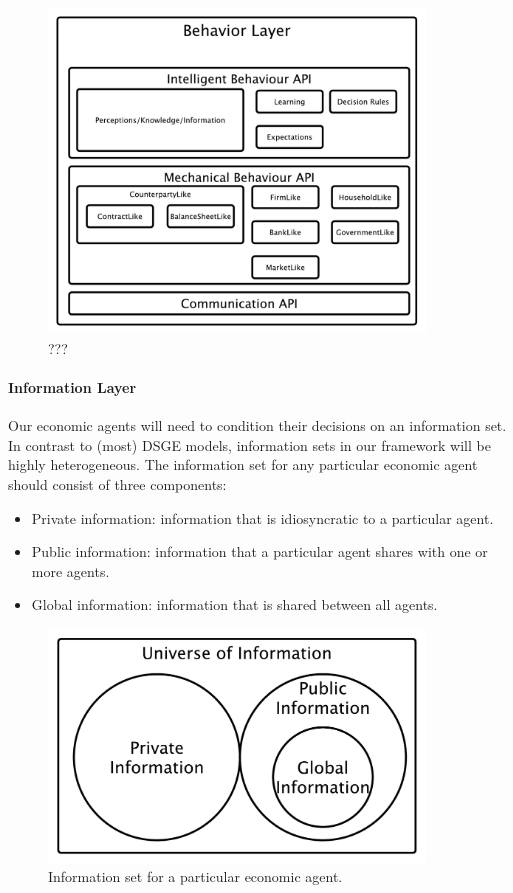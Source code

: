 \documentclass[11pt]{amsart}
\begin{document}
\begin{figure}[H]
\centering
\includegraphics[width=10cm]{img/behavior-layer.pdf}
\caption{???}
\end{figure}


\paragraph{Information Layer}
Our economic agents will need to condition their decisions on an information set.  In contrast to (most) DSGE models, information sets in our framework will be highly heterogeneous. The information set for any particular economic agent should consist of three components:
\begin{itemize}
    \item Private information: information that is idiosyncratic to a particular agent. 
    \item Public information: information that a particular agent shares with one or more agents.
    \item Global information: information that is shared between all agents.
\end{itemize}
\begin{figure}[H]
\centering
\includegraphics[width=10cm]{img/information-sets.pdf}
\caption{Information set for a particular economic agent.}
\end{figure}
\end{document}
